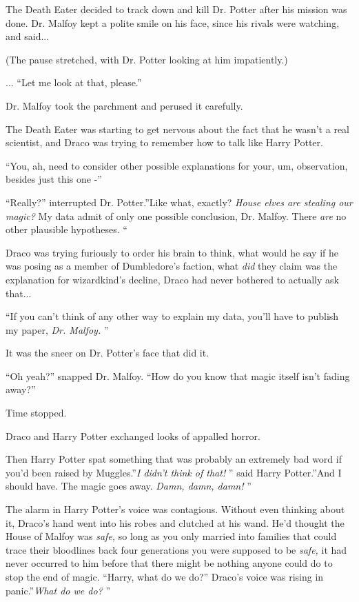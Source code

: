 The Death Eater decided to track down and kill Dr. Potter after his
mission was done. Dr. Malfoy kept a polite smile on his face, since his
rivals were watching, and said...

(The pause stretched, with Dr. Potter looking at him impatiently.)

... ``Let me look at that, please.''

Dr. Malfoy took the parchment and perused it carefully.

The Death Eater was starting to get nervous about the fact that he
wasn't a real scientist, and Draco was trying to remember how to talk
like Harry Potter.

``You, ah, need to consider other possible explanations for your, um,
observation, besides just this one -''

``Really?'' interrupted Dr. Potter.''Like what, exactly? \emph{House
elves are stealing our magic?} My data admit of only one possible
conclusion, Dr. Malfoy. There \emph{are} no other plausible hypotheses.
``

Draco was trying furiously to order his brain to think, what would he
say if he was posing as a member of Dumbledore's faction, what
\emph{did} they claim was the explanation for wizardkind's decline,
Draco had never bothered to actually ask that...

``If you can't think of any other way to explain my data, you'll have to
publish my paper, \emph{Dr. Malfoy.} ''

It was the sneer on Dr. Potter's face that did it.

``Oh yeah?'' snapped Dr. Malfoy. ``How do you know that magic itself
isn't fading away?''

Time stopped.

Draco and Harry Potter exchanged looks of appalled horror.

Then Harry Potter spat something that was probably an extremely bad word
if you'd been raised by Muggles.''\emph{I didn't think of that!} '' said
Harry Potter.''And I should have. The magic goes away. \emph{Damn, damn,
damn!} ''

The alarm in Harry Potter's voice was contagious. Without even thinking
about it, Draco's hand went into his robes and clutched at his wand.
He'd thought the House of Malfoy was \emph{safe,} so long as you only
married into families that could trace their bloodlines back four
generations you were supposed to be \emph{safe,} it had never occurred
to him before that there might be nothing anyone could do to stop the
end of magic. ``Harry, what do we do?'' Draco's voice was rising in
panic.''\emph{What do we do?} ''


